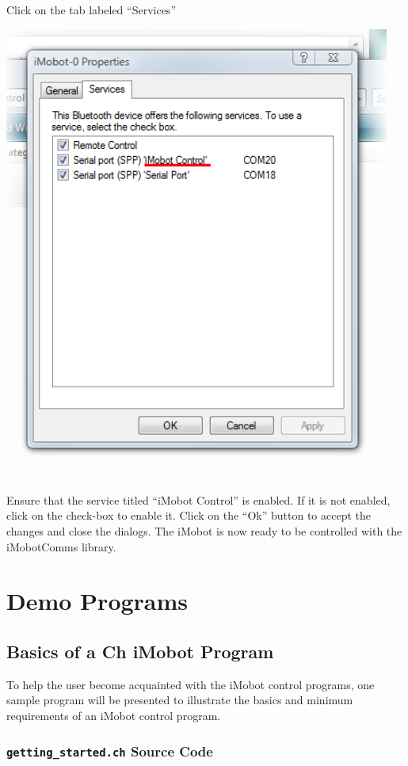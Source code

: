 \documentclass[11pt]{report}
\begin{document}
Click on the tab labeled ``Services''

\begin{center}
\includegraphics[width=5in]{images/imobot_connect_8.png}
\end{center}

Ensure that the service titled ``iMobot Control'' is enabled. If it is not
enabled, click on the check-box to enable it. Click on the ``Ok'' button to
accept the changes and close the dialogs. The iMobot is now ready to be
controlled with the iMobotComms library.

\chapter{Demo Programs}
\section{Basics of a Ch iMobot Program}
To help the user become acquainted with the iMobot control programs, one sample
program will be presented to illustrate the basics and minimum requirements of
an iMobot control program. 

\subsection{\texttt{getting\_started.ch} Source Code}

\end{document}
